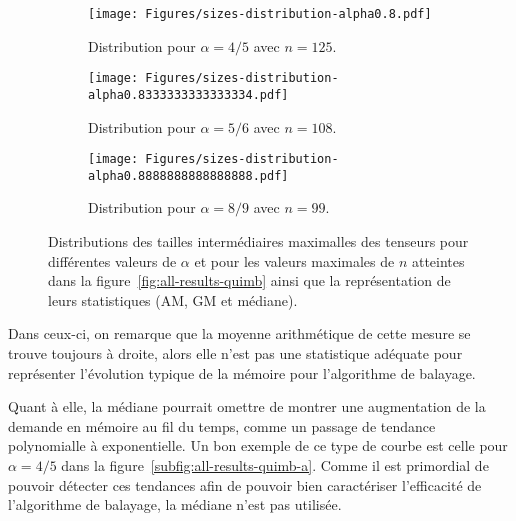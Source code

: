 \begin{figure}[h]
    \centering
    \begin{subfigure}{.49\textwidth}
        \centering
        \texttt{[image: Figures/sizes-distribution-alpha0.8.pdf]}
        \caption{Distribution pour $\alpha = 4/5$ avec $n = 125$.}
        \label{subfig:sizes-distribution-alpha4_5}
    \end{subfigure}
    \hfill
    \begin{subfigure}{.49\textwidth}
        \centering
        \texttt{[image: Figures/sizes-distribution-alpha0.8333333333333334.pdf]}
        \caption{Distribution pour $\alpha = 5/6$ avec $n = 108$.}
        \label{subfig:sizes-distribution-alpha5_6}
    \end{subfigure}
    \medskip
    \vspace{0.1cm}
    \begin{subfigure}{.49\textwidth}
        \centering
        \texttt{[image: Figures/sizes-distribution-alpha0.8888888888888888.pdf]}
        \caption{Distribution pour $\alpha = 8/9$ avec $n = 99$.}
        \label{subfig:sizes-distribution-alpha8_9}
    \end{subfigure}
    \caption[Distributions des tailles intermédiaires maximalles des tenseurs pour trois autres valeurs de $\alpha > 3/4$.]{Distributions des tailles intermédiaires maximalles des tenseurs pour différentes valeurs de $\alpha$ et pour les valeurs maximales de $n$ atteintes dans la figure~\ref{fig:all-results-quimb} ainsi que la représentation de leurs statistiques (AM, GM et médiane).}
    \label{fig:sizes-distributions}
\end{figure}
Dans ceux-ci, on remarque que la moyenne arithmétique de cette mesure se trouve toujours à droite, alors elle n'est pas une statistique adéquate pour représenter l'évolution typique de la mémoire pour l'algorithme de balayage.

Quant à elle, la médiane pourrait omettre de montrer une augmentation de la demande en mémoire au fil du temps, comme un passage de tendance polynomialle à exponentielle.
Un bon exemple de ce type de courbe est celle pour $\alpha = 4/5$ dans la figure~\ref{subfig:all-results-quimb-a}.
Comme il est primordial de pouvoir détecter ces tendances afin de pouvoir bien caractériser l'efficacité de l'algorithme de balayage, la médiane n'est pas utilisée.

